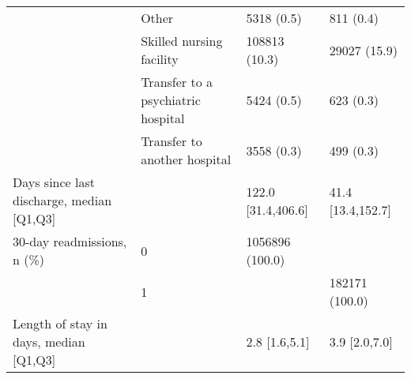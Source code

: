 \begin{tabular}{llll}
                                       & Other &                     5318 (0.5) &          811 (0.4) \\
                                       & Skilled nursing facility &                  108813 (10.3) &       29027 (15.9) \\
                                       & Transfer to a psychiatric hospital &                     5424 (0.5) &          623 (0.3) \\
                                       & Transfer to another hospital &                     3558 (0.3) &          499 (0.3) \\
Days since last discharge, median [Q1,Q3] &   &             122.0 [31.4,406.6] &  41.4 [13.4,152.7] \\
30-day readmissions, n (\%) & 0 &                1056896 (100.0) &                    \\
                                       & 1 &                                &     182171 (100.0) \\
Length of stay in days, median [Q1,Q3] &   &                  2.8 [1.6,5.1] &      3.9 [2.0,7.0] \\
\bottomrule
\end{tabular}
